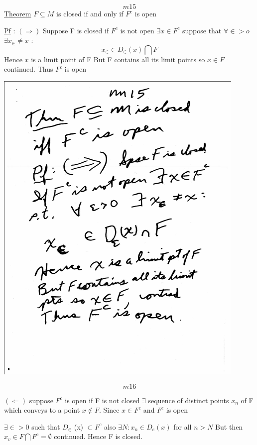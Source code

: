 \documentclass[10pt,a4paper]{article}
\begin{document}
{{$$m15$$
\underline{Theorem} $F\subseteq M$ is closed if and only if $F^c$ is open
 
\underline{Pf} : $(\Rightarrow)$ Suppose F is closed if $F^c$ is not open $\exists  x \in F^c$ suppose that $\forall \in > o$ $\exists x_\in \neq x$ :
 $$x_\in \in D_\in (x) \bigcap F$$
Hence $x$ is a limit point of F But F contains all its limit points so $x \in F$ continued. Thus $F^c$ is open

\includegraphics[scale=.75]{Pages/MS2_15}
\newpage

$$m16$$

$(\Leftarrow)$ suppose $F^c$ is open if F is not closed $\exists$ sequence of distinct points $x_n$ of F which conveys to a point $x \notin F$.
Since $x \in F^c$ and $F^c$ is open

$\exists \in > 0$ such that $D_\in$ (x) $\subset F^c$ also $\exists N : x_n \in D_e(x)$ for all $n>N$ But then $x_v \in F \bigcap F^c = \emptyset$ continued. Hence F is closed.

}}
\end{document}
